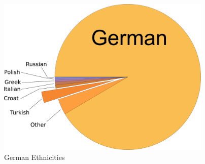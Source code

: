 \documentclass[a4paper, 14pt]{article}
\begin{document}
\begin{figure}[ht]
	\centering
	\includegraphics[height=3in]{germanpop.pdf}
	\caption{German Ethnicities}
	\label{fig:eth}
\end{figure}
\end{document}
